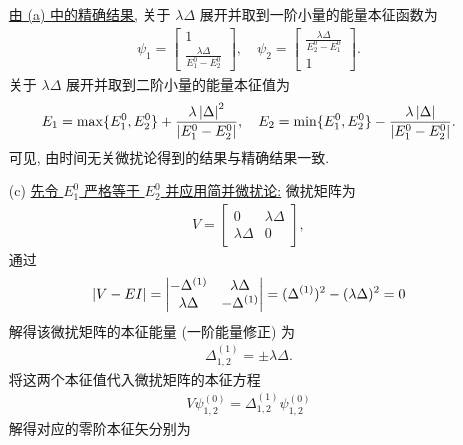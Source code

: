 \documentclass{assignment}
\begin{document}
\begin{sol}
\begin{itemize}
        \uline{由 (a) 中的精确结果,} 关于 $\lambda\Delta$ 展开并取到一阶小量的能量本征函数为
        \begin{align}
            \psi_1=\begin{bmatrix}
                1\\
                \frac{\lambda\Delta}{E_1^0-E_2^0}
            \end{bmatrix},\quad\psi_2=\begin{bmatrix}
                \frac{\lambda\Delta}{E_2^0-E_1^0}\\
                1
            \end{bmatrix}.
        \end{align}
        关于 $\lambda\Delta$ 展开并取到二阶小量的能量本征值为
        \begin{align}
            E_1=\max\{E_1^0,E_2^0\}+\frac{\lambda\left\lvert\Delta\right\rvert^2}{\left\lvert E_1^0-E_2^0\right\rvert},\quad E_2=\min\{E_1^0,E_2^0\}-\frac{\lambda\left\lvert\Delta\right\rvert}{\left\lvert E_1^0-E_2^0\right\rvert}.
        \end{align}
        可见, 由时间无关微扰论得到的结果与精确结果一致.
        \item[(c)] \uline{先令 $E_1^0$ 严格等于 $E_2^0$ 并应用简并微扰论:} 微扰矩阵为
        \begin{align}
            V=\begin{bmatrix}
                0&\lambda\Delta\\
                \lambda\Delta&0
            \end{bmatrix},
        \end{align}
        通过
        \begin{align}
            \left\lvert V-EI\right\rvert=\begin{vmatrix}
                -\Delta^{(1)}&\lambda\Delta\\
                \lambda\Delta&-\Delta^{(1)}
            \end{vmatrix}=(\Delta^{(1)})^2-(\lambda\Delta)^2=0
        \end{align}
        解得该微扰矩阵的本征能量 (一阶能量修正) 为
        \begin{align}
            \Delta_{1,2}^{(1)}=\pm\lambda\Delta.
        \end{align}
        将这两个本征值代入微扰矩阵的本征方程
        \begin{align}
            V\psi_{1,2}^{(0)}=\Delta_{1,2}^{(1)}\psi_{1,2}^{(0)}
        \end{align}
        解得对应的零阶本征矢分别为
        \begin{align}

\end{align}
\end{itemize}
\end{sol}
\end{document}
